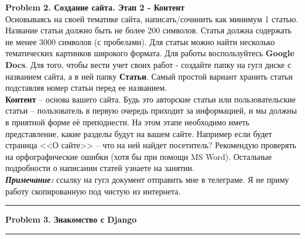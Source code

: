\documentclass[a4paper, 11pt]{extarticle}
\newenvironment{problem}[2][Problem]
    { \begin{mdframed}[backgroundcolor=gray!20] \textbf{#1 #2} \\}
    {  \end{mdframed}}
\begin{document}

\begin{problem}{2. Создание сайта. Этап 2 - Контент}
Основываясь на своей тематике сайта, написать/сочинить как минимум 1 статью. Название статьи должно быть не более 200 символов. Статья должна содержать не менее 3000 символов (с пробелами). Для статьи можно найти несколько тематических картинков широкого формата. Для работы воспользуйтесь \textbf{Google Docs}. Для того, чтобы вести учет своих работ - создайте папку на гугл диске с названием сайта, а в ней папку \textbf{Статьи}. Самый простой вариант хранить статьи подставляя номер статьи перед ее названием. \\
\textbf{Контент} -- основа вашего сайта. Будь это авторские статьи или пользовательские статьи -- пользователь в первую очередь приходит за информацией, и мы должны в приятной форме её преподнести.
На этом этапе необходимо иметь представление, какие разделы будут на вашем сайте. Например если будет страница <<О сайте>> -- что на ней найдет посетитель?
Рекомендую проверять на орфографические ошибки (хотя бы при помощи MS Word). Остальные подробности о написании статей узнаете на занятии.\\
\textit{\textbf{Примечание:}} ссылку на гугл документ отправить мне в телеграме. Я не приму работу скопированную под чистую из интернета.
\end{problem}
\noindent\rule{6.257in}{2.8pt}

\begin{problem}{3. Знакомство с Django}

\end{problem}
\noindent\rule{6.257in}{2.8pt}
\end{document}
